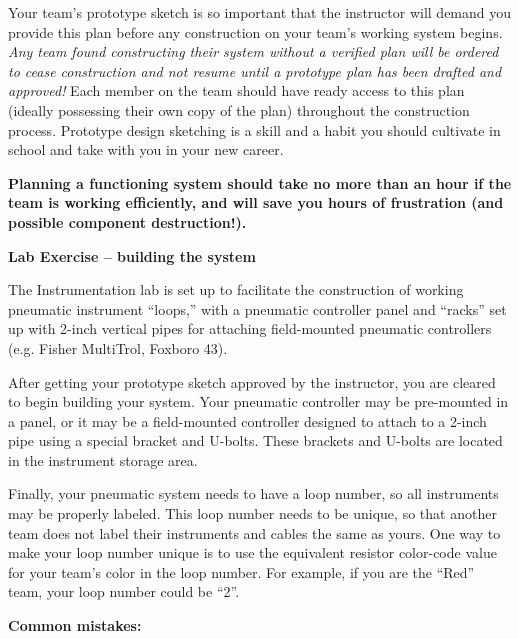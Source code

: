 \vskip 10pt

Your team's prototype sketch is so important that the instructor will demand you provide this plan before any construction on your team's working system begins.  {\it Any team found constructing their system without a verified plan will be ordered to cease construction and not resume until a prototype plan has been drafted and approved!}  Each member on the team should have ready access to this plan (ideally possessing their own copy of the plan) throughout the construction process.  Prototype design sketching is a skill and a habit you should cultivate in school and take with you in your new career.

\vskip 10pt

{\bf Planning a functioning system should take no more than an hour if the team is working efficiently, and will save you hours of frustration (and possible component destruction!).}






\vfil \eject

\noindent
{\bf Lab Exercise -- building the system}

\vskip 5pt

The Instrumentation lab is set up to facilitate the construction of working pneumatic instrument ``loops,'' with a pneumatic controller panel and ``racks'' set up with 2-inch vertical pipes for attaching field-mounted pneumatic controllers (e.g. Fisher MultiTrol, Foxboro 43).

After getting your prototype sketch approved by the instructor, you are cleared to begin building your system.  Your pneumatic controller may be pre-mounted in a panel, or it may be a field-mounted controller designed to attach to a 2-inch pipe using a special bracket and U-bolts.  These brackets and U-bolts are located in the instrument storage area.

Finally, your pneumatic system needs to have a loop number, so all instruments may be properly labeled.  This loop number needs to be unique, so that another team does not label their instruments and cables the same as yours.  One way to make your loop number unique is to use the equivalent resistor color-code value for your team's color in the loop number.  For example, if you are the ``Red'' team, your loop number could be ``2''. 

\vskip 10pt

{\bf Common mistakes:}

